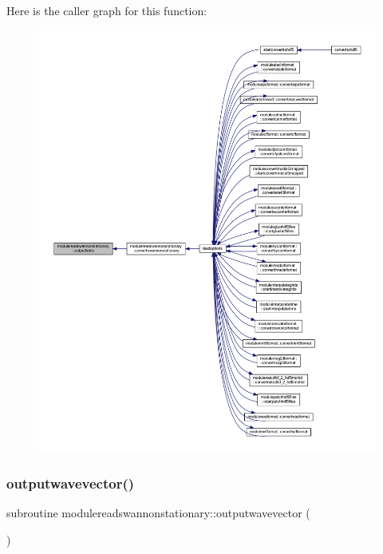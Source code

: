 Here is the caller graph for this function\+:\nopagebreak
\begin{figure}[H]
\begin{center}
\leavevmode
\includegraphics[width=350pt]{namespacemodulereadswannonstationary_a0dbbbf2bfd33dfe83b35c14911f575dc_icgraph}
\end{center}
\end{figure}
\mbox{\label{namespacemodulereadswannonstationary_a9381741247025c8f7b4fd4b06c7b9815}} 
\subsubsection{\texorpdfstring{outputwavevector()}{outputwavevector()}}
{\footnotesize\ttfamily subroutine modulereadswannonstationary\+::outputwavevector (\begin{DoxyParamCaption}{ }\end{DoxyParamCaption})\hspace{0.3cm}{\ttfamily [private]}}

